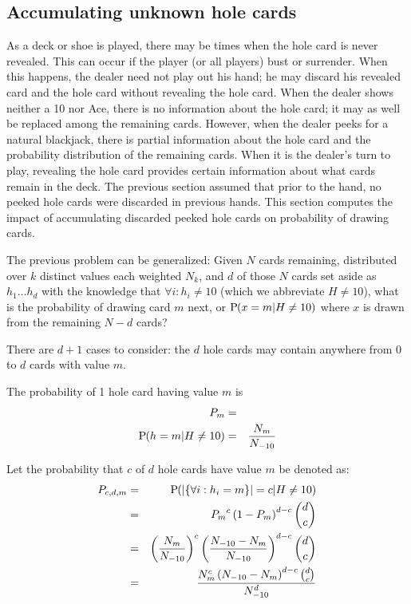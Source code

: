 \subsection{Accumulating unknown hole cards}
\label{sec:basic:peeking:accumulate}

As a deck or shoe is played, there may be times when the hole card
is never revealed.  This can occur if the player (or all players)
bust or surrender. 
When this happens, the dealer need not play out his hand; 
he may discard his revealed card and the hole card without revealing
the hole card.
When the dealer shows neither a 10 nor Ace, 
there is no information about the hole card;
it may as well be replaced among the remaining cards.  
However, when the dealer peeks for a natural blackjack,
there is partial information about the hole card
and the probability distribution of the remaining cards.  
When it is the dealer's turn to play, 
revealing the hole card provides certain information about 
what cards remain in the deck.  
The previous section assumed that prior to the hand, 
no peeked hole cards were discarded in previous hands.
This section computes the impact of accumulating discarded peeked hole cards
on probability of drawing cards.  

The previous problem can be generalized:
Given $N$ cards remaining, distributed over $k$ distinct values 
each weighted $N_k$, and $d$ of those $N$ cards 
set aside as $h_1\ldots{}h_d$
with the knowledge that $\forall{}i:h_i\neq{}10$
(which we abbreviate $H\neq{}10$), 
what is the probability of drawing card $m$ next, 
or $\textrm{P}\hspace{-.5ex}\left(x=m|H\neq{}10\right)$ where $x$ is drawn from the 
remaining $N-d$ cards?

There are $d+1$ cases to consider:
the $d$ hole cards may contain anywhere from $0$ to $d$ cards with value $m$.

The probability of 1 hole card having value $m$ is
\begin{eqnarray}
P_m &=& \nonumber \\
\textrm{P}\hspace{-.5ex}\left(h=m|H\neq{}10\right) &=& \frac{N_m}{N_{-10}}
\end{eqnarray}

\noindent
Let the probability that $c$ of $d$ hole cards have value $m$ be denoted as:
\begin{eqnarray}
P_{c,d,m} &=& \textrm{P}\hspace{-.5ex}\left(\left|\left\{\forall{}i:h_i=m\right\}\right|=c|H\neq{}10\right) \\
&=& {P_m}^c \left(1-P_m\right)^{d-c} \binom{d}{c} \\
&=& \left(\frac{N_m}{N_{-10}}\right)^c\left(\frac{N_{-10}-N_m}{N_{-10}}\right)^{d-c} \binom{d}{c} \\
&=& \frac{N_m^c\left(N_{-10}-N_m\right)^{d-c}\binom{d}{c}}{N_{-10}^d}
\end{eqnarray}

